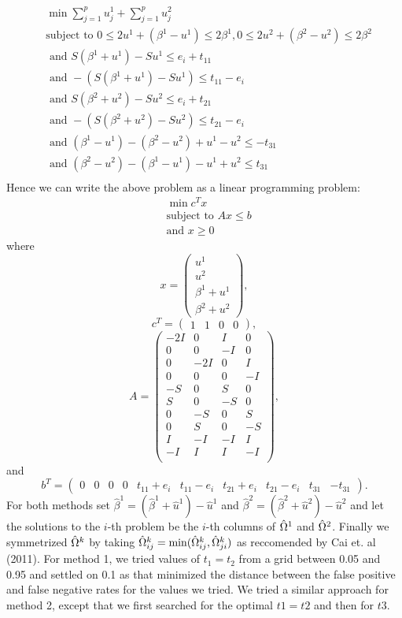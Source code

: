\documentclass[12pt, leqno]{article}
\let\oldhat\hat
\renewcommand{\hat}[1]{\oldhat{{#1}}}
\def\om{\ensuremath\Omega}
\begin{document}
\begin{align*}
&\min \sum_{j = 1}^p{u_j^1} +  \sum_{j = 1}^p{u_j^2} \\
&\text{subject to } 0 \leq 2u^1 + (\beta^{1}-u^1) \leq 2 \beta^{1},0 \leq 2u^2+
  (\beta^{2}-u^2) \leq 2\beta^{2} \\
&\text{ and } S(\beta^{1} + u^1) - Su^1\leq e_i + t_11 \\
&\text{ and }  - (S(\beta^{1} + u^1) - Su^1)  \leq t_11 - e_i \\
&\text{ and } S(\beta^{2} + u^2) - Su^2 \leq e_i + t_21 \\
&\text{ and }  - (S(\beta^{2} + u^2) - Su^2)  \leq t_21 - e_i \\
&\text{ and } (\beta^{1} - u^1) - (\beta^{2} - u^2) + u^1 - u^2 \leq -t_31 \\
&\text{ and } (\beta^{2}-u^2)- (\beta^{1}-u^1) - u^1 + u^2\leq t_31 \\
\end{align*}
Hence we can write the above problem as a linear programming problem:
\begin{align*}
&\min c^Tx \\
&\text{subject to } Ax \leq b \\
&\text{and } x \geq 0
\end{align*}
where 
\[
x = \begin{pmatrix} u^1 \\u^2 \\\beta^{1} + u^1 \\ \beta^{2} + u^2 \end{pmatrix},
\]
\[
c^T = \begin{pmatrix} 1 &1&0&0 \end{pmatrix},
\]
\[
A = \begin{pmatrix} 
-2I&0&I&0\\
0&0&-I&0\\
0&-2I&0&I\\
0&0&0&-I\\
-S&0&S&0\\
S&0&-S&0\\
0&-S&0&S\\
0&S&0&-S\\
I&-I&-I&I\\
-I&I&I&-I\\
\end{pmatrix},
\]
and
\[
b^T = \begin{pmatrix}
  0&0&0&0&t_11+e_i&t_11-e_i&t_21+e_i&t_21-e_i&t_31&-t_31 \end{pmatrix}.
\]
For both methods set $\hat{\beta}^1 = (\hat{\beta}^1+\hat{u}^1) - \hat{u}^1$ and
$\hat{\beta}^2 = (\hat{\beta}^2+\hat{u}^2) - \hat{u}^2$ and let the solutions
to the $i$-th problem be the $i$-th columns of
$\hat{\om}^1$ and $\hat{\om}^2$. Finally we symmetrized $\hat{\om}^k$
by taking $\hat{\om}^k_{ij} = \min(\hat{\om}^k_{ij},\hat{\om}^k_{ji})$
as reccomended by Cai et. al (2011). For method 1, we tried values of $t_1= t_2$ from a
grid between 0.05 and 0.95 and settled on 0.1 as that minimized the
distance between the false positive and false negative rates for the
values we tried. We tried a similar approach for method 2, except that
we first searched for the optimal $t1=t2$ and then for $t3$.
\end{document}
